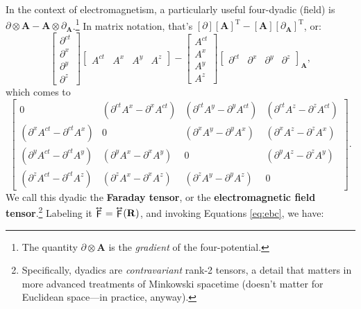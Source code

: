 \documentclass[12pt]{article}
\renewcommand{\vv}[1]{\mathbf{#1}}
\newcommand{\tightoverset}[2]{%
  \mathop{#2}\limits^{\vbox to -.5ex{\kern-0.75ex\hbox{$#1$}\vss}}}
\newcommand{\inlinedy}[1]{\tightoverset{\text{\tiny$\bm\leftrightarrow$}}{#1}}
\begin{document}
In the context of electromagnetism, a particularly useful four-dyadic (field) is $\partialup \otimes \vv A - \vv A \otimes \partialup_{\vv A}$.\footnote{The quantity $\partialup \otimes \vv A$ is the \emph{gradient} of the four-potential.} In matrix notation, that's $[\partialup][\vv A]^{\mathrm{T}} - [\vv A][\partialup_{\vv A}]^{\mathrm{T}}$, or:
\begin{equation*}
\begin{bmatrix}
\partial^{ct} \\
\partial^x \\
\partial^y \\
\partial^z
\end{bmatrix}
\begin{bmatrix}
A^{ct} & A^x & A^y & A^z
\end{bmatrix}
-
\begin{bmatrix}
A^{ct} \\
A^x \\
A^y \\
A^z
\end{bmatrix}
\begin{bmatrix}
\partial^{ct} & \partial^x & \partial^y & \partial^z
\end{bmatrix}_{\vv A},
\end{equation*}
which comes to
\begin{equation*}
\begin{bmatrix}
0 & ( \partial^{ct} A^x - \partial^x A^{ct} ) & ( \partial^{ct} A^y - \partial^y A^{ct} ) & ( \partial^{ct} A^z - \partial^z A^{ct} ) \\[1.5ex]
( \partial^x A^{ct} - \partial^{ct} A^x ) & 0 & ( \partial^x A^y - \partial^y A^x ) & ( \partial^x A^z - \partial^z A^x ) \\[1.5ex]
( \partial^y A^{ct} - \partial^{ct} A^y ) & ( \partial^y A^x - \partial^x A^y ) & 0 & ( \partial^y A^z - \partial^z A^y ) \\[1.5ex]
( \partial^z A^{ct} - \partial^{ct} A^z ) & ( \partial^z A^x - \partial^x A^z ) & ( \partial^z A^y - \partial^y A^z ) & 0
\end{bmatrix} .
\end{equation*}
We call this dyadic the \textbf{Faraday tensor}, or the \textbf{electromagnetic field tensor}.\footnote{\label{fn:dy}Specifically, dyadics are \emph{contravariant} rank-2 tensors, a detail that matters in more advanced treatments of Minkowski spacetime (doesn't matter for Euclidean space---in practice, anyway).} Labeling it $\inlinedy{\mathsf{F}} = \inlinedy{\mathsf{F}} (\vv R)$, and invoking Equations \ref{eq:ebc}, we have:
\end{document}
